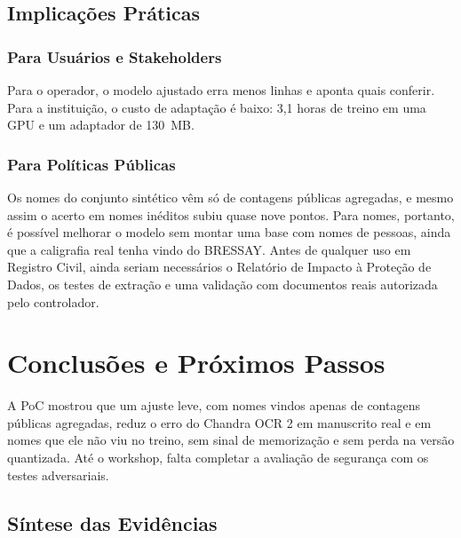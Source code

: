 \documentclass[12pt,a4paper]{article}
\begin{document}
\subsection{Implicações Práticas}

\subsubsection{Para Usuários e Stakeholders}
Para o operador, o modelo ajustado erra menos linhas e aponta quais conferir. Para a instituição, o custo de adaptação é baixo: 3,1 horas de treino em uma GPU e um adaptador de 130~MB.

\subsubsection{Para Políticas Públicas}
Os nomes do conjunto sintético vêm só de contagens públicas agregadas, e mesmo assim o acerto em nomes inéditos subiu quase nove pontos. Para nomes, portanto, é possível melhorar o modelo sem montar uma base com nomes de pessoas, ainda que a caligrafia real tenha vindo do BRESSAY. Antes de qualquer uso em Registro Civil, ainda seriam necessários o Relatório de Impacto à Proteção de Dados, os testes de extração e uma validação com documentos reais autorizada pelo controlador.

\section{Conclusões e Próximos Passos}
\label{sec:conclusoes}

A PoC mostrou que um ajuste leve, com nomes vindos apenas de contagens públicas agregadas, reduz o erro do Chandra OCR 2 em manuscrito real e em nomes que ele não viu no treino, sem sinal de memorização e sem perda na versão quantizada. Até o workshop, falta completar a avaliação de segurança com os testes adversariais.

\subsection{Síntese das Evidências}
\end{document}
